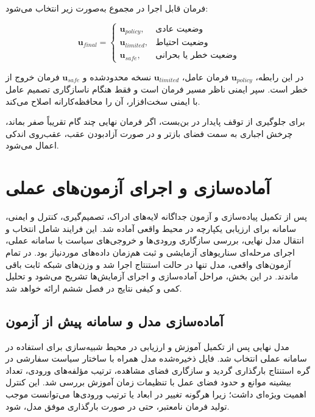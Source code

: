 فرمان قابل اجرا در مجموع به‌صورت زیر انتخاب می‌شود:

\begin{equation}
	\mathbf{u}_{final} =
	\begin{cases}
		\mathbf{u}_{policy}, & \text{وضعیت عادی} \\
		\mathbf{u}_{limited}, & \text{وضعیت احتیاط} \\
		\mathbf{u}_{safe}, & \text{وضعیت خطر یا بحرانی}
	\end{cases}
	\label{eq:real_safe_command_selection}
\end{equation}

در این رابطه، $\mathbf{u}_{policy}$ فرمان عامل، $\mathbf{u}_{limited}$ نسخه محدودشده و $\mathbf{u}_{safe}$ فرمان خروج از خطر است. سپر ایمنی ناظر مسیر فرمان است و فقط هنگام ناسازگاری تصمیم عامل با ایمنی سخت‌افزار، آن را محافظه‌کارانه اصلاح می‌کند.

برای جلوگیری از توقف پایدار در بن‌بست، اگر فرمان نهایی چند گام تقریباً صفر بماند، چرخش اجباری به سمت فضای بازتر و در صورت آزادبودن عقب، عقب‌روی اندکی اعمال می‌شود.

\section{آماده‌سازی و اجرای آزمون‌های عملی}
\label{sec:real_test_preparation_and_execution}

پس از تکمیل پیاده‌سازی و آزمون جداگانه لایه‌های ادراک، تصمیم‌گیری، کنترل و ایمنی، سامانه برای ارزیابی یکپارچه در محیط واقعی آماده شد. این فرایند شامل انتخاب و انتقال مدل نهایی، بررسی سازگاری ورودی‌ها و خروجی‌های سیاست با سامانه عملی، اجرای مرحله‌ای سناریوهای آزمایشی و ثبت هم‌زمان داده‌های موردنیاز بود. در تمام آزمون‌های واقعی، مدل تنها در حالت استنتاج اجرا شد و وزن‌های شبکه ثابت باقی ماندند. در این بخش، مراحل آماده‌سازی و اجرای آزمایش‌ها تشریح می‌شود و تحلیل کمی و کیفی نتایج در فصل ششم ارائه خواهد شد.

\subsection{آماده‌سازی مدل و سامانه پیش از آزمون}
\label{subsec:real_model_system_preparation}

مدل نهایی  پس از تکمیل آموزش و ارزیابی در محیط شبیه‌سازی برای استفاده در سامانه عملی انتخاب شد. فایل ذخیره‌شده مدل همراه با ساختار سیاست سفارشی در گره استنتاج بارگذاری گردید و سازگاری فضای مشاهده، ترتیب مؤلفه‌های ورودی، تعداد بیشینه موانع و حدود فضای عمل با تنظیمات زمان آموزش بررسی شد. این کنترل اهمیت ویژه‌ای داشت؛ زیرا هرگونه تغییر در ابعاد یا ترتیب ورودی‌ها می‌توانست موجب تولید فرمان نامعتبر، حتی در صورت بارگذاری موفق مدل، شود.


